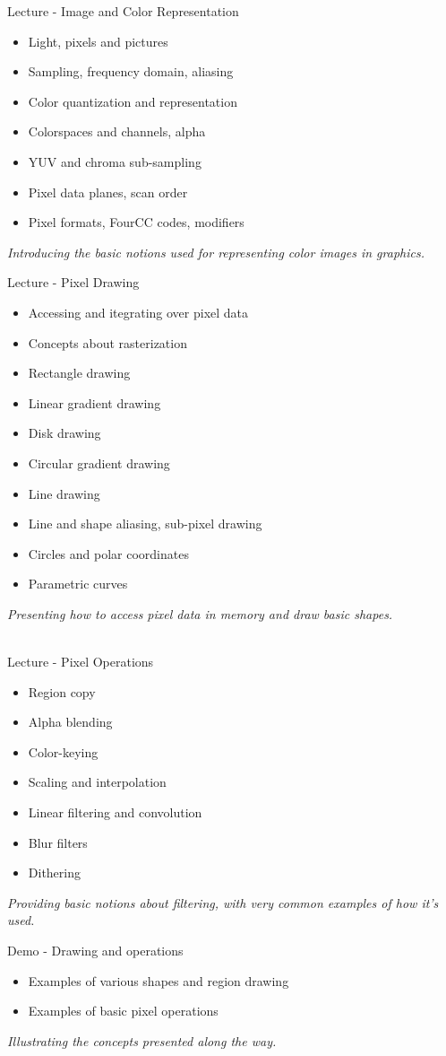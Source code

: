 \documentclass[a4paper,12pt,obeyspaces,spaces,hyphens]{article}
\begin{document}
\feagendatwocolumn
{Lecture - Image and Color Representation}
{
  \begin{itemize}
  \item Light, pixels and pictures
  \item Sampling, frequency domain, aliasing
  \item Color quantization and representation
  \item Colorspaces and channels, alpha
  \item YUV and chroma sub-sampling
  \item Pixel data planes, scan order
  \item Pixel formats, FourCC codes, modifiers
  \end{itemize}
  \vspace{0.5em}
  {\em Introducing the basic notions used for representing color images in graphics.}
}
{Lecture - Pixel Drawing}
{
  \begin{itemize}
  \item Accessing and itegrating over pixel data
  \item Concepts about rasterization
  \item Rectangle drawing
  \item Linear gradient drawing
  \item Disk drawing
  \item Circular gradient drawing
  \item Line drawing
  \item Line and shape aliasing, sub-pixel drawing
  \item Circles and polar coordinates
  \item Parametric curves
  \end{itemize}
  \vspace{0.5em}
  {\em Presenting how to access pixel data in memory and draw basic shapes.}
}
\\
\feagendatwocolumn
{Lecture - Pixel Operations}
{
  \begin{itemize}
  \item Region copy
  \item Alpha blending
  \item Color-keying
  \item Scaling and interpolation
  \item Linear filtering and convolution
  \item Blur filters
  \item Dithering
  \end{itemize}
  \vspace{0.5em}
  {\em Providing basic notions about filtering, with very common examples of how it's used.}
}
{Demo - Drawing and operations}
{
  \begin{itemize}
  \item Examples of various shapes and region drawing
  \item Examples of basic pixel operations
  \end{itemize}
  \vspace{0.5em}
  {\em Illustrating the concepts presented along the way.}
}
\end{document}
